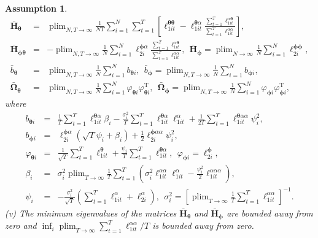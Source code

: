 \documentclass[12pt]{article}
\def\T{{ \mathrm{\scriptscriptstyle T} }}
\def\thetavec{\bm{\theta}}
\def\phivec{\bm{\phi}}
\def\H{\bm{H}}
\def\O{\bm{\Omega}}
\DeclareMathOperator{\plim}{plim}
\newtheorem{assumption}{Assumption}
\begin{document}
\begin{assumption}
\begin{eqnarray*}
\bar{\H}_{\thetavec} &=&  \plim_{N,T \to \infty} \frac{1}{NT} \sum_{i=1}^N \sum_{t=1}^T \left[ \ell_{1it}^{\thetavec \thetavec} - \ell_{1it}^{\thetavec \alpha} \frac{\sum_{t=1}^T \ell_{1it}^{\alpha \thetavec } }{\sum_{t=1}^T  \ell_{1it}^{\alpha \alpha }} \right], \\
\bar{\H}_{\phivec\thetavec} &=&  - \plim_{N,T \to \infty} \frac{1}{N} \sum_{i=1}^N  \ell_{2i}^{\phivec \alpha} \frac{\sum_{t=1}^T \ell_{1it}^{\alpha \thetavec } }{\sum_{t=1}^T  \ell_{1it}^{\alpha \alpha }}, \ \
\bar{\H}_{\phivec} =  \plim_{N \to \infty} \frac{1}{N} \sum_{i=1}^N  \ell_{2i}^{\phivec \phivec}, \\
\bar{b}_{\thetavec} &=&   \plim_{N,T \to \infty} \frac{1}{N} \sum_{i=1}^N b_{\thetavec i}, \ \
\bar{b}_{\phivec} =   \plim_{N,T \to \infty} \frac{1}{N} \sum_{i=1}^N b_{\phivec i}, \\
\bar{\O}_{\thetavec} &=& \plim_{N,T \to \infty} \frac{1}{N} \sum_{i=1}^N \varphi_{\thetavec i} \varphi_{\thetavec i}^{\T}, \ \ \bar{\O}_{\phivec} = \plim_{N,T \to \infty} \frac{1}{N} \sum_{i=1}^N \varphi_{\phivec i} \varphi_{\phivec i}^{\T}, 
\end{eqnarray*}
where 
\begin{eqnarray*}
b_{\thetavec i} &=&  \frac{1}{T} \sum_{t=1}^T  \ell_{1it}^{\thetavec \alpha} \beta_i -   \frac{\sigma_i^2}{T} \sum_{t=1}^T  \ell_{1it}^{\thetavec \alpha} \ell_{1it}^{\alpha}  + \frac{1}{2T} \sum_{t=1}^T \ell_{1it}^{\thetavec \alpha \alpha} \psi_i^2, \\
b_{\phivec i} &=&    \ell_{2i}^{\phivec \alpha}(\sqrt{T}    \psi_i  + \beta_i)  + \frac{1}{2}  \ell_{2i}^{\phivec \alpha \alpha}  \psi_i^2, 
 \\
\varphi_{\thetavec i} &=& \frac{1}{\sqrt{T}} \sum_{t=1}^T \ell_{1it}^{\thetavec} +   \frac{\psi_i}{T} \sum_{t=1}^T \ell_{1it}^{\thetavec \alpha}, \ \ \varphi_{\phivec i} =  \ell_{2i}^{\phivec},
\\
\beta_i &=& \sigma_i^2 \plim_{T\to \infty} \frac{1}{T} \sum_{t=1}^T \left(\sigma_i^2 \ell_{1it}^{\alpha \alpha} \ell_{1it}^{\alpha} - \frac{\psi_i^2}{2} \ell_{1it}^{\alpha \alpha \alpha}   \right),\\
\psi_i &=& - \frac{\sigma_i^2}{\sqrt{T}} \left(  \sum_{t=1}^T \ell_{1it}^{\alpha} + \ell_{2i}^{\alpha} \right),  \ \ \sigma_i^2 =  \left[ \plim_{T\to \infty} \frac{1}{T} \sum_{t=1}^T \ell_{1it}^{\alpha\alpha} \right]^{-1}.
\end{eqnarray*}
(v) The minimum eigenvalues of the matrices $\bar{\H}_{\thetavec}$ and $\bar{\H}_{\phivec}$ are bounded away from zero and $\inf_i \plim_{T \to \infty} \sum_{t=1}^T  \ell_{1it}^{\alpha\alpha}/T$ is bounded away from zero.

\end{assumption}
\end{document}
